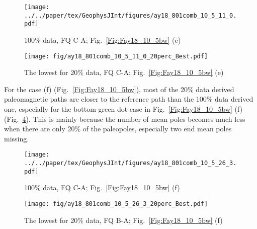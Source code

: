 \begin{figure*}[tbp]
  \captionsetup[subfigure]{labelformat=empty,aboveskip=-6pt,belowskip=-6pt}
  \centering
  \begin{subfigure}[htbp]{.49\textwidth}
    \captionsetup{skip=0pt}
    \centering
    \texttt{[image: ../../paper/tex/GeophysJInt/figures/ay18\_801comb\_10\_5\_11\_0.pdf]}
	\caption{100\% data, FQ C-A; Fig.~\ref{Fig:Fay18_10_5bw}
	(e)}\label{Fig:Fay18_10_5b801}
  \end{subfigure}
  \begin{subfigure}[htbp]{.49\textwidth}
    \captionsetup{skip=0pt}
    \centering
    \texttt{[image: fig/ay18\_801comb\_10\_5\_11\_0\_20perc\_Best.pdf]} %
    \caption{The lowest for 20\% data, FQ C-A;
	Fig.~\ref{Fig:Fay18_10_5bw} (e)}\label{Fig:Fay18_10_5b801l20p}
  \end{subfigure}
  \caption[Less data, better similarity?]{Comparing the 100\% Australian
  120 Ma paleomagnetic data derived result with the best of the only
  20\% data derived results (the bottom yellow dot on the 20\% gridline in
  Fig.~\ref{Fig:Fay18_10_5bw}
  (e)).}\label{Fig:Fay18_10_5b801l20p_vs_100p}
\end{figure*}

For the case (f) (Fig.~\ref{Fig:Fay18_10_5bw}), most of the 20\% data derived
paleomagnetic paths are closer to the reference path than the 100\% data derived
one, especially for the bottom green dot case in Fig.~\ref{Fig:Fay18_10_5bw} (f)
(Fig.~\ref{Fig:Fay18_10_5w801l20p}). This is mainly because the number of mean
poles becomes much less when there are only 20\% of the paleopoles, especially
two end mean poles missing.

\begin{figure*}[tbp]
  \captionsetup[subfigure]{labelformat=empty,aboveskip=-6pt,belowskip=-6pt}
  \centering
  \begin{subfigure}[htbp]{.49\textwidth}
    \captionsetup{skip=0pt}
    \centering
    \texttt{[image: ../../paper/tex/GeophysJInt/figures/ay18\_801comb\_10\_5\_26\_3.pdf]}
    \caption{100\% data, FQ C-A; Fig.~\ref{Fig:Fay18_10_5bw}
    (f)}\label{Fig:Fay18_10_5w801}
  \end{subfigure}
  \begin{subfigure}[htbp]{.49\textwidth}
    \captionsetup{skip=0pt}
    \centering
    \texttt{[image: fig/ay18\_801comb\_10\_5\_26\_3\_20perc\_Best.pdf]} %
    \caption{The lowest for 20\% data, FQ B-A; Fig.~\ref{Fig:Fay18_10_5bw}
    (f)}\label{Fig:Fay18_10_5w801l20p}
  \end{subfigure}
  \caption[Less data, better similarity?]{Comparing the 100\% Australian
  120 Ma paleomagnetic data derived result with the best of the only
  20\% data derived results (the bottom green dot in Fig.~\ref{Fig:Fay18_10_5bw}
  (f)).}\label{Fig:Fay18_10_5w801l20p_vs_100p}
\end{figure*}

